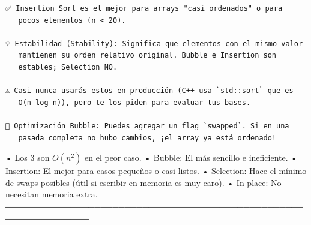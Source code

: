 \begin{lstlisting}
✅ Insertion Sort es el mejor para arrays "casi ordenados" o para 
   pocos elementos (n < 20).

💡 Estabilidad (Stability): Significa que elementos con el mismo valor
   mantienen su orden relativo original. Bubble e Insertion son 
   estables; Selection NO.

⚠️ Casi nunca usarás estos en producción (C++ usa `std::sort` que es 
   O(n log n)), pero te los piden para evaluar tus bases.

🔑 Optimización Bubble: Puedes agregar un flag `swapped`. Si en una
   pasada completa no hubo cambios, ¡el array ya está ordenado!
\end{lstlisting}

\begin{dsaresumen}

• Los 3 son $O(n^2)$ en el peor caso.
• Bubble: El más sencillo e ineficiente.
• Insertion: El mejor para casos pequeños o casi listos.
• Selection: Hace el mínimo de swaps posibles (útil si escribir en 
  memoria es muy caro).
• In-place: No necesitan memoria extra.
════════════════════════════════════════════════════════════════

\end{dsaresumen}


